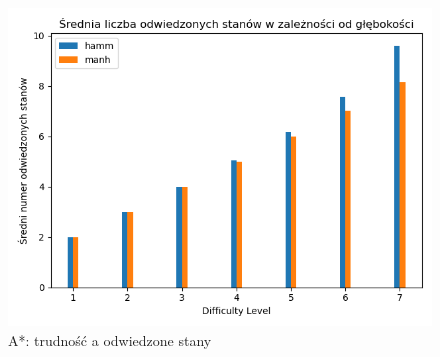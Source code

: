 \documentclass{classrep}
\begin{document}
\begin{figure}[p] \centering
 \includegraphics[width=0.9\linewidth]{./pic/astr_vstd_c_vs_diff.png}
 \caption{A*: trudność a odwiedzone stany}
\end{figure}
\end{document}
